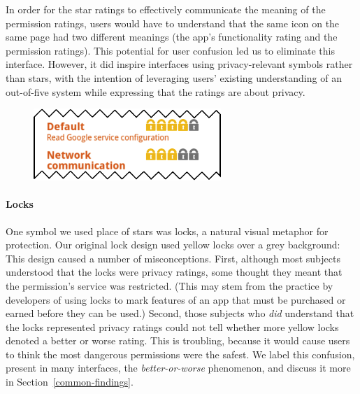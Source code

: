 \documentclass[11pt]{article}
\newcommand{\refsec}[1]{Section~\ref{#1}}
\begin{document}
In order for the star ratings to effectively communicate the meaning of the permission 
ratings, users would have to understand that the same icon
on the same page had two different meanings (the app's functionality
rating and the permission ratings). This potential for user confusion led
us to eliminate this interface.
However, it did inspire interfaces using privacy-relevant symbols rather than stars, with 
the intention of
leveraging users' existing understanding of an out-of-five system while
expressing that the ratings are about privacy.


\begin{figure}
\begin{center}
\includegraphics[width=.9\linewidth]{candidate-img/locks/locksR1.png}
\end{center}
\end{figure}

\paragraph{Locks}
\label{s-sec-locks}

One symbol we used place of stars was locks, a natural visual metaphor for protection.
Our original lock design used yellow locks over a grey background:
This design caused a number of
misconceptions.
First, although most subjects understood that the locks were privacy 
ratings, some thought they meant that 
the permission's service was restricted. (This may 
stem from the practice by developers of using locks to mark features of 
an app that must be purchased or earned before they can be used.)
Second, those subjects who \emph{did} understand that the locks represented privacy ratings
could not tell whether more yellow locks denoted a better or worse 
rating. This is troubling, because it would cause users to think the most 
dangerous permissions were the safest. We label this confusion,
present in many interfaces, the 
\emph{better-or-worse} phenomenon, and discuss it more in \refsec{common-findings}.
\end{document}
